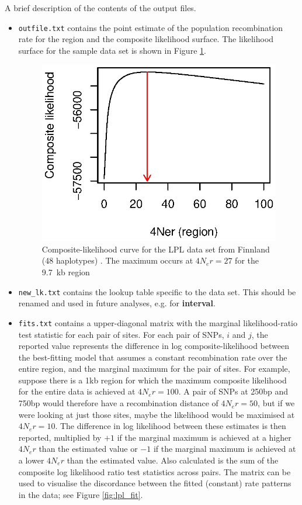 \documentclass[a4paper,10pt,fullpage]{article}
\begin{document}
\noindent A brief description of the contents of the output files.
\begin{itemize}
\item {\verb+outfile.txt+} contains the point estimate of the
population recombination rate for the region and the composite
likelihood surface.  The likelihood surface for the sample data
set is shown in Figure \ref{fig:lpl_surf}.


\begin{figure}
\linespread{1.3} \centering
\includegraphics[scale=1.0]{LPLCLcurve.eps}
\caption{Composite-likelihood curve for the LPL data set from
Finnland (48 haplotypes) \cite{Nickersonetal98}.  The maximum
occurs at $4N_er=27$ for the 9.7~kb region} \label{fig:lpl_surf}
\end{figure}

\item {\verb+new_lk.txt+} contains the lookup table specific to the
data set.  This should be renamed and used in future analyses,
e.g. for {\bf interval}.

\item {\verb+fits.txt+} contains a upper-diagonal matrix with the
marginal likelihood-ratio test statistic for each pair of sites.
For each pair of SNPs, $i$ and $j$, the reported value represents
the difference in log composite-likelihood between the
best-fitting model that assumes a constant recombination rate over
the entire region, and the marginal maximum for the pair of sites.
For example, suppose there is a 1kb region for which the maximum
composite likelihood for the entire data is achieved at $4N_er =
100$.  A pair of SNPs at 250bp and 750bp would therefore have a
recombination distance of $4N_er = 50$, but if we were looking at
just those sites, maybe the likelihood would be maximised at
$4N_er = 10$.  The difference in log likelihood between these
estimates is then reported, multiplied by $+1$ if the marginal
maximum is achieved at a higher $4N_er$ than the estimated value
or $-1$ if the marginal maximum is achieved at a lower $4N_er$
than the estimated value.  Also calculated is the sum of the
composite log likelihood ratio test statistics across pairs.  The
matrix can be used to visualise the discordance between the fitted
(constant) rate patterns in the data; see Figure
\ref{fig:lpl_fit}.


\end{itemize}
\end{document}
